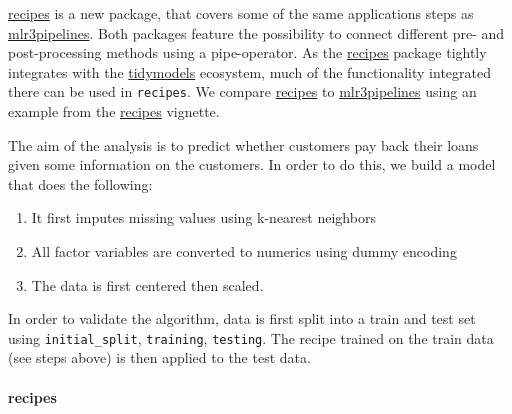 \documentclass[]{article}
\providecommand{\tightlist}{%
  \setlength{\itemsep}{0pt}\setlength{\parskip}{0pt}}
\let\oldparagraph\paragraph
\renewcommand{\paragraph}[1]{\oldparagraph{#1}\mbox{}}
\begin{document}
\href{https://cran.r-project.org/package=recipes}{recipes} is a new package, that covers some of the same applications steps as \href{https://cran.r-project.org/package=mlr3pipelines}{mlr3pipelines}.
Both packages feature the possibility to connect different pre- and post-processing methods using a pipe-operator.
As the \href{https://cran.r-project.org/package=recipes}{recipes} package tightly integrates with the \href{https://cran.r-project.org/package=tidymodels}{tidymodels} ecosystem, much of the functionality integrated there can be used in \texttt{recipes}.
We compare \href{https://cran.r-project.org/package=recipes}{recipes} to \href{https://cran.r-project.org/package=mlr3pipelines}{mlr3pipelines} using an example from the \href{https://cran.r-project.org/package=recipes}{recipes} vignette.

The aim of the analysis is to predict whether customers pay back their loans given some information on the customers.
In order to do this, we build a model that does the following:

\begin{enumerate}
\def\labelenumi{\arabic{enumi}.}
\tightlist
\item
  It first imputes missing values using k-nearest neighbors
\item
  All factor variables are converted to numerics using dummy encoding
\item
  The data is first centered then scaled.
\end{enumerate}

In order to validate the algorithm, data is first split into a train and test set using \texttt{initial\_split}, \texttt{training}, \texttt{testing}.
The recipe trained on the train data (see steps above) is then applied to the test data.

\hypertarget{recipes}{%
\paragraph{recipes}\label{recipes}}
\end{document}
